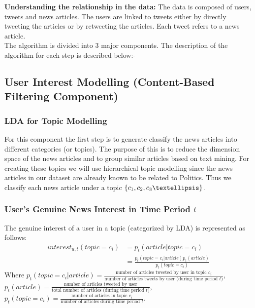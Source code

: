 \documentclass{article}
\begin{document}
\textbf{Understanding the relationship in the data:} The data is composed of users, tweets and news articles. The users are linked to tweets either by directly tweeting the articles or by retweeting the articles. Each tweet refers to a news article. \\

The algorithm is divided into 3 major components. The description of the algorithm for each step is described below:- \\

\subsection{User Interest Modelling (Content-Based Filtering Component)}

\subsubsection{LDA for Topic Modelling}

For this component the first step is to generate classify the news articles into different categories (or topics). The purpose of this is to reduce the dimension space of the news articles and to group similar articles based on text mining. For creating these topics we will use hierarchical topic modelling since the news articles in our dataset are already known to be related to Politics. Thus we classify each news article under a topic $\{c_1, c_2, c_3 \textellipsis \}$. \\

\subsubsection{User’s Genuine News Interest in Time Period $t$}

The genuine interest of a user in a topic (categorized by LDA) is represented as follows:
\begin{equation}
\begin{aligned} 
interest_{u,t}(topic = c_i) 
& = p_t(article | topic = c_i) \\
& = \frac{p_t(topic = c_i| article) p_t(article)}{p_t(topic = c_i)}
\end{aligned}
\end{equation}
Where $p_t(topic = c_i| article) = \displaystyle \frac{\textrm{number of articles tweeted by user in topic $c_i$}}{\textrm{number of articles tweets by user (during time period $t$)}}$, \\
$p_t(article) = \displaystyle \frac{\textrm{number of articles tweeted by user}}{\textrm{total number of articles (during time period $t$)}}$, \\
$p_t(topic = c_i) = \displaystyle \frac{\textrm{number of articles in topic $c_i$}}{\textrm{number of articles during time period $t$}} $.
\end{document}
